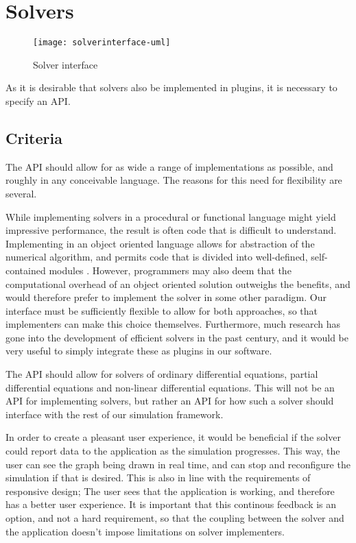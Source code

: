 \documentclass[\rootfolder/main.tex]{subfiles}
\begin{document}
\section{Solvers}

\begin{figure}[h]
  \centering
  \texttt{[image: solverinterface-uml]}
  \caption{Solver interface}
  \label{fig:solver-interface}
\end{figure}

As it is desirable that solvers also be implemented in plugins, it is necessary to specify an API.

\subsection{Criteria}

The API should allow for as wide a range of implementations as possible, and roughly in any conceivable language.
The reasons for this need for flexibility are several.

While implementing solvers in a procedural or functional language might yield impressive performance, the result is often code that is difficult to understand.
Implementing in an object oriented language allows for abstraction of the numerical algorithm, and permits code that is divided into well-defined, self-contained modules \cite{kees1999}.
However, programmers may also deem that the computational overhead of an object oriented solution outweighs the benefits, and would therefore prefer to implement the solver in some other paradigm.
Our interface must be sufficiently flexible to allow for both approaches, so that implementers can make this choice themselves.
Furthermore, much research has gone into the development of efficient solvers in the past century, and it would be very useful to simply integrate these as plugins in our software.

The API should allow for solvers of ordinary differential equations, partial differential equations and non-linear differential equations.
This will not be an API for implementing solvers, but rather an API for how such a solver should interface with the rest of our simulation framework.

In order to create a pleasant user experience, it would be beneficial if the solver could report data to the application as the simulation progresses.
This way, the user can see the graph being drawn in real time, and can stop and reconfigure the simulation if that is desired.
This is also in line with the requirements of responsive design; The user sees that the application is working, and therefore has a better user experience.
It is important that this continous feedback is an option, and not a hard requirement, so that the coupling between the solver and the application doesn't impose limitations on solver implementers.
\end{document}
